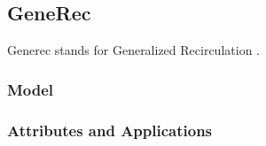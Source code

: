 \subsection{GeneRec}

Generec stands for Generalized Recirculation \cite{o1996bio}\cite{o1996leabra}.

\subsubsection{Model}

\subsubsection{Attributes and Applications}



